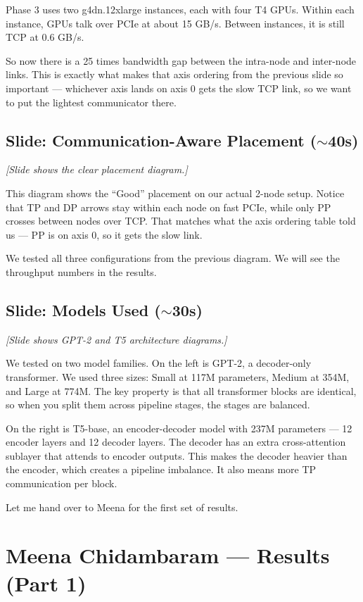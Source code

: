 \documentclass[11pt, a4paper]{article}
\begin{document}
Phase 3 uses two g4dn.12xlarge instances, each with four T4 GPUs. Within each instance, GPUs talk over PCIe at about 15 GB/s. Between instances, it is still TCP at 0.6 GB/s.

So now there is a 25 times bandwidth gap between the intra-node and inter-node links. This is exactly what makes that axis ordering from the previous slide so important --- whichever axis lands on axis 0 gets the slow TCP link, so we want to put the lightest communicator there.

\subsection{Slide: Communication-Aware Placement ($\sim$40s)}
\textit{[Slide shows the clear placement diagram.]}

This diagram shows the ``Good'' placement on our actual 2-node setup. Notice that TP and DP arrows stay within each node on fast PCIe, while only PP crosses between nodes over TCP. That matches what the axis ordering table told us --- PP is on axis 0, so it gets the slow link.

We tested all three configurations from the previous diagram. We will see the throughput numbers in the results.

\subsection{Slide: Models Used ($\sim$30s)}
\textit{[Slide shows GPT-2 and T5 architecture diagrams.]}

We tested on two model families. On the left is GPT-2, a decoder-only transformer. We used three sizes: Small at 117M parameters, Medium at 354M, and Large at 774M. The key property is that all transformer blocks are identical, so when you split them across pipeline stages, the stages are balanced.

On the right is T5-base, an encoder-decoder model with 237M parameters --- 12 encoder layers and 12 decoder layers. The decoder has an extra cross-attention sublayer that attends to encoder outputs. This makes the decoder heavier than the encoder, which creates a pipeline imbalance. It also means more TP communication per block.

Let me hand over to Meena for the first set of results.

\section{Meena Chidambaram --- Results (Part 1)}
\end{document}
